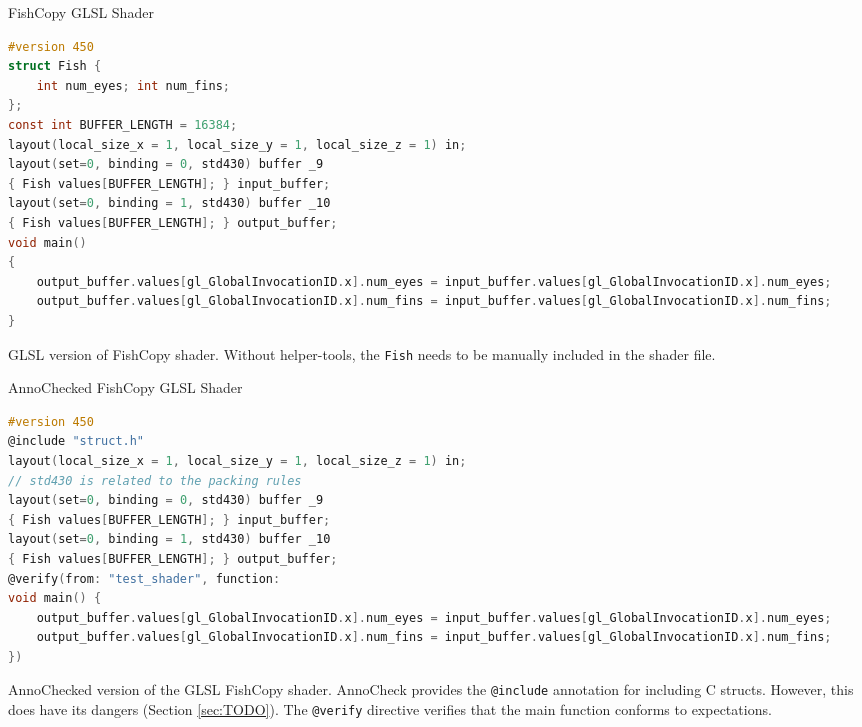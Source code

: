 \documentclass[a4paper,12pt,twoside,openright]{report}
\begin{document}
\begin{lstfloat}
\begin{center}
FishCopy GLSL Shader
\end{center}
\begin{lstlisting}[language=C]
#version 450
struct Fish {
    int num_eyes; int num_fins;
};
const int BUFFER_LENGTH = 16384;
layout(local_size_x = 1, local_size_y = 1, local_size_z = 1) in;
layout(set=0, binding = 0, std430) buffer _9
{ Fish values[BUFFER_LENGTH]; } input_buffer;
layout(set=0, binding = 1, std430) buffer _10
{ Fish values[BUFFER_LENGTH]; } output_buffer;
void main()
{
    output_buffer.values[gl_GlobalInvocationID.x].num_eyes = input_buffer.values[gl_GlobalInvocationID.x].num_eyes;
    output_buffer.values[gl_GlobalInvocationID.x].num_fins = input_buffer.values[gl_GlobalInvocationID.x].num_fins;
}
\end{lstlisting}
\caption{GLSL version of FishCopy shader. Without helper-tools, the
\texttt{Fish} needs to be manually included in the shader file.}
\label{lst:glsl_shader}
\end{lstfloat}

\begin{lstfloat}
\begin{center}
AnnoChecked FishCopy GLSL Shader
\end{center}
\begin{lstlisting}[language=C]
#version 450
@include "struct.h"
layout(local_size_x = 1, local_size_y = 1, local_size_z = 1) in;
// std430 is related to the packing rules
layout(set=0, binding = 0, std430) buffer _9
{ Fish values[BUFFER_LENGTH]; } input_buffer;
layout(set=0, binding = 1, std430) buffer _10
{ Fish values[BUFFER_LENGTH]; } output_buffer;
@verify(from: "test_shader", function:
void main() {
    output_buffer.values[gl_GlobalInvocationID.x].num_eyes = input_buffer.values[gl_GlobalInvocationID.x].num_eyes;
    output_buffer.values[gl_GlobalInvocationID.x].num_fins = input_buffer.values[gl_GlobalInvocationID.x].num_fins;
})
\end{lstlisting}
\caption{AnnoChecked version of the GLSL FishCopy shader. AnnoCheck provides
the \texttt{@include} annotation for including C structs. However, this does
have its dangers (Section \ref{sec:TODO}). The \texttt{@verify} directive
verifies that the main function conforms to expectations.}
\label{lst:anno_check_shader}
\end{lstfloat}
\end{document}
